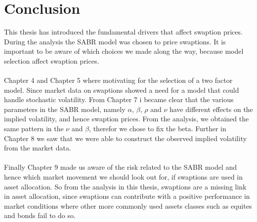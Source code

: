 \section{Conclusion}
This thesis has introduced the fundamental 
drivers that affect swaption prices. 
During the analysis the SABR model was chosen
to price swaptions. It is important to be aware
of which choices we made along the way, 
because model selection affect swaption prices. 
\\\\
Chapter 4 and Chapter 5 where motivating for 
the selection of a two factor model. 
Since market data on swaptions showed a need
for a model that could handle stochastic 
volatility. From Chapter 7 i became clear 
that the various parameters in the SABR model, 
namely $\alpha$, $\beta$, $\rho$ and $\nu$ 
have different effects on the implied volatility,
and hence swaption prices. 
From the analysis, we obtained the same pattern in 
the $\nu$ and $\beta$, therefor we chose 
to fix the beta. Further in Chapter 8 we saw that we
were able to construct the observed implied volatility
from the market data. 
\\\\
Finally Chapter 9 made us aware
of the risk related to the SABR model and hence which market 
movement we should look out for, if swaptions are used
in asset allocation.  So from the analysis 
in this thesis, swaptions are a missing link in asset 
allocation, since swaptions can contribute with 
a positive performance in market conditions where other more commonly used assets 
classes such as equites and bonds fail to do so.

